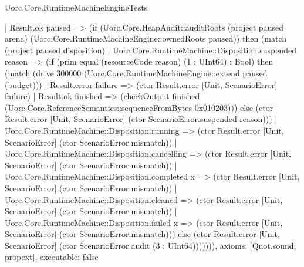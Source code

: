 \begin{lexlean}{Uorc.Core.RuntimeMachineEngineTests}
\begin{semanticmodule}
{      | Result.ok paused => (if (Uorc.Core.HeapAudit::auditRoots (project paused arena) (Uorc.Core.RuntimeMachineEngine::ownedRoots paused)) then (match (project paused disposition)
        | Uorc.Core.RuntimeMachine::Disposition.suspended reason => (if (prim equal (resourceCode reason) (1 : UInt64) : Bool) then (match (drive 300000 (Uorc.Core.RuntimeMachineEngine::extend paused (budget)))
          | Result.error failure => (ctor Result.error [Unit, ScenarioError] failure)
          | Result.ok finished => (checkOutput finished (Uorc.Core.ReferenceSemantics::sequenceFromBytes 0x010203))) else (ctor Result.error [Unit, ScenarioError] (ctor ScenarioError.suspended reason)))
        | Uorc.Core.RuntimeMachine::Disposition.running => (ctor Result.error [Unit, ScenarioError] (ctor ScenarioError.mismatch))
        | Uorc.Core.RuntimeMachine::Disposition.cancelling => (ctor Result.error [Unit, ScenarioError] (ctor ScenarioError.mismatch))
        | Uorc.Core.RuntimeMachine::Disposition.completed x => (ctor Result.error [Unit, ScenarioError] (ctor ScenarioError.mismatch))
        | Uorc.Core.RuntimeMachine::Disposition.cleaned => (ctor Result.error [Unit, ScenarioError] (ctor ScenarioError.mismatch))
        | Uorc.Core.RuntimeMachine::Disposition.failed x => (ctor Result.error [Unit, ScenarioError] (ctor ScenarioError.mismatch))) else (ctor Result.error [Unit, ScenarioError] (ctor ScenarioError.audit (3 : UInt64))))))),
  axioms: [Quot.sound, propext],
  executable: false
}


\end{semanticmodule}
\end{lexlean}
